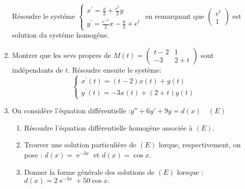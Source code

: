 \documentclass[12pt,a4paper]{article}
\DeclareMathOperator{\E}{\mathrm{e}}
\begin{document}
\begin{enumerate}
		R\'{e}soudre le syst\'{e}me $\left\{ 
\begin{array}{l}
	x^{\prime }=\frac{x}{2}+\frac{e^{t}}{2}y  \\ 
	y^{\prime }=\frac{e^{-t}}{2}x-\frac{y}{2}+e^{t}%
\end{array}%
\right. $ en remarquant que $\left( 
\begin{array}{c}
	e^{t} \\ 
	1%
\end{array}%
\right) $ est solution du syst\'{e}me homog\'{e}ne.

%		
\item
Montrer que les sevs propres de $M\left( t\right) =\left( 
\begin{array}{cc}
	t-2 & 1 \\ 
	-3 & 2+t%
\end{array}%
\right) $ sont ind\'{e}pendants de $t.$ R\'{e}soudre ensuite le syst\`{e}me:%
\begin{equation*}
	\left\{ 
	\begin{array}{l}
		x^{\prime }\left( t\right) =\left( t-2\right) x\left( t\right) +y\left(
		t\right)  \\ 
		y^{\prime }\left( t\right) =-3x\left( t\right) +\left( 2+t\right) y\left(
		t\right) 
	\end{array}%
	\right. 
\end{equation*}
\item On consid\`ere l'\'equation diff\'erentielle :$y''+6y'+9y=d(x) \quad (E)$
\begin{enumerate}
	\item R\'esoudre l'\'equation diff\'erentielle
	homog\`ene associ\'ee \`a $(E)$.
	\item Trouver une solution particuli\`ere de $(E)$
	lorque, respectivement, on pose :
	$ d(x) = \E^{-3x}$ et $d(x)=\cos x.$
	\item Donner la forme g\'en\'erale des solutions de $(E)$
	lorsque :
	$d(x) = 2\E^{-3x}+50\cos x.$
\end{enumerate}

\end{enumerate}
\end{document}
